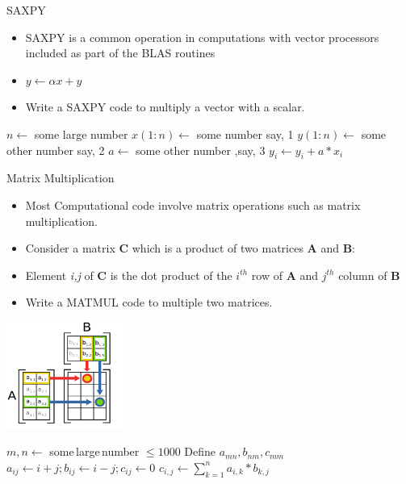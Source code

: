 \documentclass[10pt,t]{beamer}
\begin{document}
\begin{frame}{\small SAXPY}
  \begin{itemize}
    \item SAXPY is a common operation in computations with vector processors included as part of the BLAS routines
    \item[] $y\leftarrow \alpha x + y$
    \item Write a SAXPY code to multiply a vector with a scalar.
  \end{itemize}
  \begin{algorithm}[H]
    \caption{Pseudo Code for SAXPY}
    \begin{algorithmic}
      \State $n \gets$ some large number
      \State $x(1:n) \gets$ some number say, 1
      \State $y(1:n) \gets$ some other number say, 2
      \State $a \gets$ some other number ,say, 3
      \State $y_i \gets y_i + a * x_i$
      \EndDo
    \end{algorithmic}
  \end{algorithm}
\end{frame}

\begin{frame}[allowframebreaks]{Matrix Multiplication}
  \begin{itemize}
    \item Most Computational code involve matrix operations such as matrix multiplication.
    \item Consider a matrix {\bf C} which is a product of two matrices {\bf A} and {\bf B}:
    \item[] Element {\it i,j} of {\bf C} is the dot product of the $i^{th}$ row of {\bf A} and $j^{th}$ column of {\bf B}
    \item Write a MATMUL code to multiple two matrices.
  \end{itemize}
  \begin{center}
    \includegraphics[width=0.3\textwidth]{./graphics/matmul}
  \end{center}

  \begin{algorithm}[H]
    \caption{Pseudo Code for MATMUL}
    \begin{algorithmic}
      \State $m,n \gets$ some\,large\,number $\le 1000$
      \State Define $a_{mn}, b_{nm}, c_{mm}$
      \State $a_{ij} \gets i+j; b_{ij} \gets i-j; c_{ij} \gets 0$
      \State $c_{i,j} \gets \sum^{n}_{k=1} a_{i,k}*b_{k,j}$
      \EndDo
      \EndDo
    \end{algorithmic}
  \end{algorithm}
\end{frame}
\end{document}
